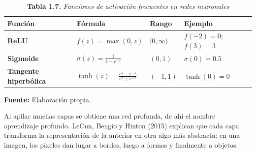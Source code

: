 \begin{table}[htpb!]
\centering
\small\sffamily
\caption{\textbf{Tabla 1.7.} \textit{Funciones de activación frecuentes en redes neuronales}}
\vspace{0.15cm}
\begin{tabularx}{\textwidth}{>{\bfseries}p{3.2cm} >{\raggedright\arraybackslash}p{4.0cm} >{\raggedright\arraybackslash}p{3.0cm} >{\raggedright\arraybackslash}X}
\toprule
Función & Fórmula & Rango & Ejemplo \\
\midrule
ReLU & $f(z) = \max(0, z)$ & $[0, \infty)$ & $f(-2) = 0$; $f(3) = 3$ \\
\midrule
Sigmoide & $\sigma(z) = \frac{1}{1 + e^{-z}}$ & $(0, 1)$ & $\sigma(0) = 0.5$ \\
\midrule
Tangente hiperbólica & $\tanh(z) = \frac{e^z - e^{-z}}{e^z + e^{-z}}$ & $(-1, 1)$ & $\tanh(0) = 0$ \\
\bottomrule
\end{tabularx}
\vspace{0.15cm}
\raggedright\scriptsize \textbf{Fuente:} Elaboración propia.
\end{table}

Al apilar muchas capas se obtiene una red profunda, de ahí el nombre aprendizaje profundo. LeCun, Bengio y Hinton (2015) explican que cada capa transforma la representación de la anterior en otra algo más abstracta: en una imagen, los píxeles dan lugar a bordes, luego a formas y finalmente a objetos.

